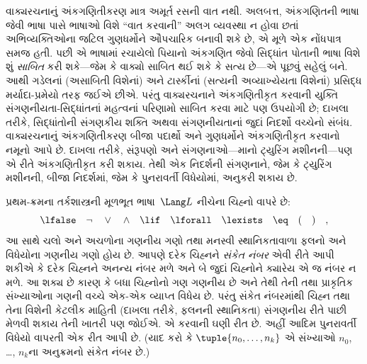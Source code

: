 વાક્યરચનાનું અંકગણિતીકરણ માત્ર અમૂર્ત
રસની વાત નથી. અલબત્ત, અંકગણિતની ભાષા
જેવી ભાષા પાસે ભાષાઓ વિશે ``વાત કરવાની''
અલગ વ્યવસ્થા ન હોવા છતાં અભિવ્યક્તિઓના
જટિલ ગુણધર્મોને ઔપચારિક બનાવી શકે છે,
એ મૂળે એક નોંધપાત્ર સમજ હતી. પછી એ
ભાષામાં રચાયેલો પિયાનો અંકગણિત જેવો
સિદ્ધાંત પોતાની ભાષા વિશે શું \emph{સાબિત}
કરી શકે—જેમ કે વાક્યો સાબિત
થઈ શકે કે સત્ય છે—એ પૂછવું સહેલું બને.
આથી ગડેલનાં (અસાબિતી વિશેનાં) અને
ટાર્સ્કીનાં (સત્યની અવ્યાખ્યેયતા વિશેનાં)
પ્રસિદ્ધ મર્યાદા-પ્રમેયો તરફ જઈએ છીએ.
પરંતુ વાક્યરચનાને અંકગણિતીકૃત કરવાની
યુક્તિ સંગણનીયતા-સિદ્ધાંતનાં મહત્વનાં
પરિણામો સાબિત કરવા માટે પણ ઉપયોગી છે;
દાખલા તરીકે, સિદ્ધાંતોની સંગણકીય શક્તિ
અથવા સંગણનીયતાનાં જુદાં નિદર્શો વચ્ચેનો
સંબંધ. વાક્યરચનાનું અંકગણિતીકરણ બીજા
પદાર્થો અને ગુણધર્મોને અંકગણિતીકૃત કરવાનો
નમૂનો આપે છે. દાખલા તરીકે, સંરૂપણો
અને સંગણનાઓ—માનો ટ્યુરિંગ મશીનની—પણ
એ રીતે અંકગણિતીકૃત કરી શકાય. તેથી
એક નિદર્શની સંગણનાને, જેમ કે ટ્યુરિંગ
મશીનની, બીજા નિદર્શમાં, જેમ કે પુનરાવર્તી
વિધેયોમાં, અનુકરી શકાય છે.
\endgroup


\begingroup
\makeatletter{}\makeatother

\label{guunit:OLP-0282}


પ્રથમ-ક્રમના તર્કશાસ્ત્રની મૂળભૂત ભાષા~$\Lang L$
નીચેના ચિહ્નો વાપરે છે:
\[
\lfalse \quad \lnot \quad \lor \quad \land \quad \lif \quad \lforall
\quad \lexists \quad \eq \quad ( \quad ) \quad ,
\]
આ સાથે ચલો અને અચળોના
ગણનીય ગણો તથા મનસ્વી સ્થાનિકતાવાળા
ફલનો અને વિધેયોના
ગણનીય ગણો હોય છે. આપણે દરેક
ચિહ્નને \emph{સંકેત નંબર} એવી રીતે આપી
શકીએ કે દરેક ચિહ્નને અનન્ય નંબર મળે અને
બે જુદાં ચિહ્નોને ક્યારેય એ જ નંબર ન મળે.
આ શક્ય છે કારણ કે બધા ચિહ્નોનો ગણ
ગણનીય છે અને તેથી તેની તથા
પ્રાકૃતિક સંખ્યાઓના ગણની વચ્ચે
એક-એક વ્યાપ્ત વિધેય છે. પરંતુ સંકેત નંબરમાંથી
ચિહ્ન તથા તેના વિશેની કેટલીક માહિતી
(દાખલા તરીકે, ફલનની સ્થાનિકતા)
સંગણનીય રીતે પાછી મેળવી શકાય તેની
ખાતરી પણ જોઈએ. એ કરવાની ઘણી રીત છે.
અહીં આદિમ પુનરાવર્તી વિધેયો વાપરતી
એક રીત આપી છે. (યાદ કરો કે
$\tuple{n_0, \dots, n_k}$ એ સંખ્યાઓ
$n_0$, \dots, $n_k$ના અનુક્રમનો સંકેત
નંબર છે.)

